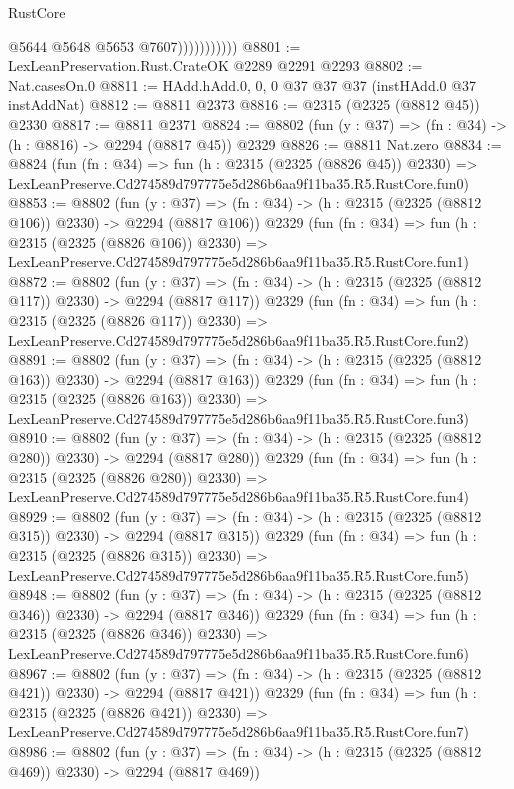 \begin{lexlean}{RustCore}
\begin{coremodule}
                          @5644
                          @5648
                          @5653
                          @7607)))))))))))
@8801 := LexLeanPreservation.Rust.CrateOK @2289 @2291 @2293
@8802 := Nat.casesOn.{0}
@8811 := HAdd.hAdd.{0, 0, 0} @37 @37 @37 (instHAdd.{0} @37 instAddNat)
@8812 := @8811 @2373
@8816 := @2315 (@2325 (@8812 @45)) @2330
@8817 := @8811 @2371
@8824 := @8802 (fun (y : @37) => (fn : @34) -> (h : @8816) -> @2294 (@8817 @45)) @2329
@8826 := @8811 Nat.zero
@8834 := @8824
    (fun (fn : @34) =>
    fun (h : @2315 (@2325 (@8826 @45)) @2330) =>
    LexLeanPreserve.Cd274589d797775e5d286b6aa9f11ba35.R5.RustCore.fun0)
@8853 := @8802
    (fun (y : @37) => (fn : @34) -> (h : @2315 (@2325 (@8812 @106)) @2330) -> @2294 (@8817 @106))
    @2329
    (fun (fn : @34) =>
    fun (h : @2315 (@2325 (@8826 @106)) @2330) =>
    LexLeanPreserve.Cd274589d797775e5d286b6aa9f11ba35.R5.RustCore.fun1)
@8872 := @8802
    (fun (y : @37) => (fn : @34) -> (h : @2315 (@2325 (@8812 @117)) @2330) -> @2294 (@8817 @117))
    @2329
    (fun (fn : @34) =>
    fun (h : @2315 (@2325 (@8826 @117)) @2330) =>
    LexLeanPreserve.Cd274589d797775e5d286b6aa9f11ba35.R5.RustCore.fun2)
@8891 := @8802
    (fun (y : @37) => (fn : @34) -> (h : @2315 (@2325 (@8812 @163)) @2330) -> @2294 (@8817 @163))
    @2329
    (fun (fn : @34) =>
    fun (h : @2315 (@2325 (@8826 @163)) @2330) =>
    LexLeanPreserve.Cd274589d797775e5d286b6aa9f11ba35.R5.RustCore.fun3)
@8910 := @8802
    (fun (y : @37) => (fn : @34) -> (h : @2315 (@2325 (@8812 @280)) @2330) -> @2294 (@8817 @280))
    @2329
    (fun (fn : @34) =>
    fun (h : @2315 (@2325 (@8826 @280)) @2330) =>
    LexLeanPreserve.Cd274589d797775e5d286b6aa9f11ba35.R5.RustCore.fun4)
@8929 := @8802
    (fun (y : @37) => (fn : @34) -> (h : @2315 (@2325 (@8812 @315)) @2330) -> @2294 (@8817 @315))
    @2329
    (fun (fn : @34) =>
    fun (h : @2315 (@2325 (@8826 @315)) @2330) =>
    LexLeanPreserve.Cd274589d797775e5d286b6aa9f11ba35.R5.RustCore.fun5)
@8948 := @8802
    (fun (y : @37) => (fn : @34) -> (h : @2315 (@2325 (@8812 @346)) @2330) -> @2294 (@8817 @346))
    @2329
    (fun (fn : @34) =>
    fun (h : @2315 (@2325 (@8826 @346)) @2330) =>
    LexLeanPreserve.Cd274589d797775e5d286b6aa9f11ba35.R5.RustCore.fun6)
@8967 := @8802
    (fun (y : @37) => (fn : @34) -> (h : @2315 (@2325 (@8812 @421)) @2330) -> @2294 (@8817 @421))
    @2329
    (fun (fn : @34) =>
    fun (h : @2315 (@2325 (@8826 @421)) @2330) =>
    LexLeanPreserve.Cd274589d797775e5d286b6aa9f11ba35.R5.RustCore.fun7)
@8986 := @8802
    (fun (y : @37) => (fn : @34) -> (h : @2315 (@2325 (@8812 @469)) @2330) -> @2294 (@8817 @469))

\end{coremodule}
\end{lexlean}
